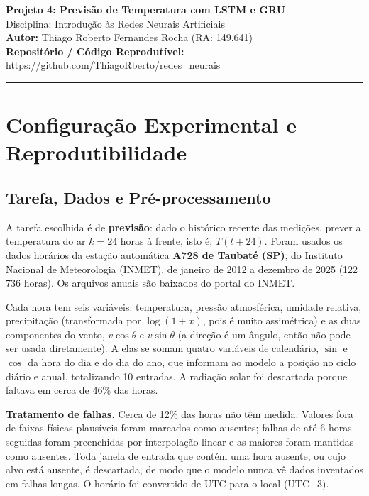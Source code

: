 \documentclass[11pt,a4paper]{article}
\begin{document}
\begin{center}
    {\LARGE \textbf{Projeto 4: Previsão de Temperatura com LSTM e GRU}} \\[0.35em]
    {\large Disciplina: Introdução às Redes Neurais Artificiais} \\[0.3em]
    \textbf{Autor:} Thiago Roberto Fernandes Rocha (RA: 149.641) \\[0.2em]
    \textbf{Repositório / Código Reprodutível:} \url{https://github.com/ThiagoRberto/redes_neurais}
\end{center}
\vspace{-0.5em}
\hrule
\vspace{0.8em}

\section{Configuração Experimental e Reprodutibilidade}

\subsection{Tarefa, Dados e Pré-processamento}
A tarefa escolhida é de \textbf{previsão}: dado o histórico recente das medições, prever a temperatura do ar $k=24$ horas à frente, isto é, $T(t+24)$. Foram usados os dados horários da estação automática \textbf{A728 de Taubaté (SP)}, do Instituto Nacional de Meteorologia (INMET), de janeiro de 2012 a dezembro de 2025 (122\,736 horas). Os arquivos anuais são baixados do portal do INMET.

Cada hora tem seis variáveis: temperatura, pressão atmosférica, umidade relativa, precipitação (transformada por $\log(1+x)$, pois é muito assimétrica) e as duas componentes do vento, $v\cos\theta$ e $v\sin\theta$ (a direção é um ângulo, então não pode ser usada diretamente). A elas se somam quatro variáveis de calendário, $\sin$ e $\cos$ da hora do dia e do dia do ano, que informam ao modelo a posição no ciclo diário e anual, totalizando 10 entradas. A radiação solar foi descartada porque faltava em cerca de 46\% das horas.

\textbf{Tratamento de falhas.} Cerca de 12\% das horas não têm medida. Valores fora de faixas físicas plausíveis foram marcados como ausentes; falhas de até 6 horas seguidas foram preenchidas por interpolação linear e as maiores foram mantidas como ausentes. Toda janela de entrada que contém uma hora ausente, ou cujo alvo está ausente, é descartada, de modo que o modelo nunca vê dados inventados em falhas longas. O horário foi convertido de UTC para o local (UTC$-3$).
\end{document}
